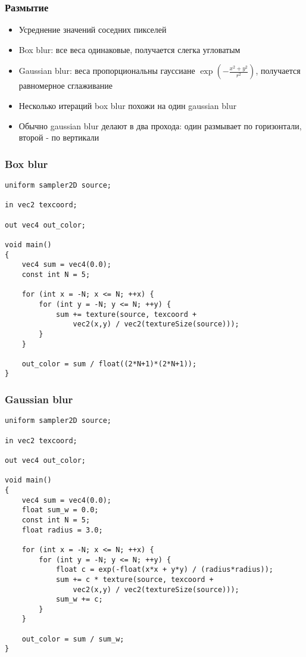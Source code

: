 \documentclass{beamer}
\begin{document}

\begin{frame}[fragile]
\frametitle{Размытие}
\begin{itemize}
\item Усреднение значений соседних пикселей
\pause
\item Box blur: все веса одинаковые, получается слегка угловатым
\pause
\item Gaussian blur: веса пропорциональны гауссиане \begin{math}\exp\left(-\frac{x^2+y^2}{r^2}\right)\end{math}, получается равномерное сглаживание
\pause
\item Несколько итераций box blur похожи на один gaussian blur
\pause
\item Обычно gaussian blur делают в два прохода: один размывает по горизонтали, второй - по вертикали
\end{itemize}
\end{frame}

\begin{frame}[fragile]
\frametitle{Box blur}
\fontsize{10pt}{10pt}
\begin{verbatim}
uniform sampler2D source;

in vec2 texcoord;

out vec4 out_color;

void main()
{
    vec4 sum = vec4(0.0);
    const int N = 5;

    for (int x = -N; x <= N; ++x) {
        for (int y = -N; y <= N; ++y) {
            sum += texture(source, texcoord +
                vec2(x,y) / vec2(textureSize(source)));
        }
    }

    out_color = sum / float((2*N+1)*(2*N+1));
}
\end{verbatim}
\end{frame}

\begin{frame}[fragile]
\frametitle{Gaussian blur}
\fontsize{10pt}{10pt}
\begin{verbatim}
uniform sampler2D source;

in vec2 texcoord;

out vec4 out_color;

void main()
{
    vec4 sum = vec4(0.0);
    float sum_w = 0.0;
    const int N = 5;
    float radius = 3.0;

    for (int x = -N; x <= N; ++x) {
        for (int y = -N; y <= N; ++y) {
            float c = exp(-float(x*x + y*y) / (radius*radius));
            sum += c * texture(source, texcoord +
                vec2(x,y) / vec2(textureSize(source)));
            sum_w += c;
        }
    }

    out_color = sum / sum_w;
}
\end{verbatim}
\end{frame}
\end{document}
